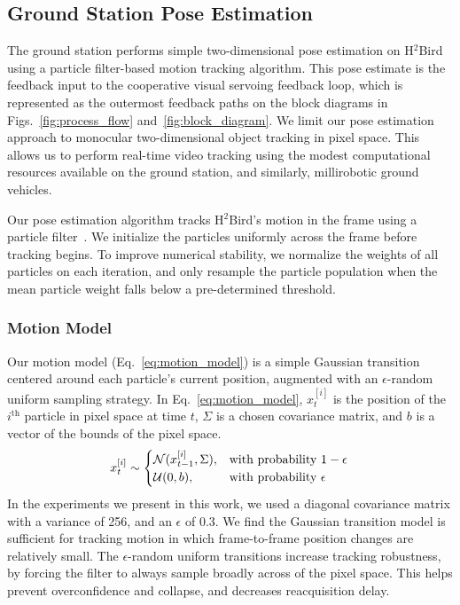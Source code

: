 \documentclass{aamas2013}
\begin{document}
\subsection{Ground Station Pose Estimation}
The ground station performs simple two-dimensional pose estimation on 
H$^2$Bird using a particle filter-based motion tracking algorithm. This pose 
estimate is the feedback input to the cooperative visual servoing feedback 
loop, which is represented as the outermost feedback paths on the block 
diagrams in Figs.~\ref{fig:process_flow} and~\ref{fig:block_diagram}. We 
limit our pose estimation approach to monocular two-dimensional object 
tracking in pixel space. This allows us to perform real-time video tracking 
using the modest computational resources available on the ground station, 
and similarly, millirobotic ground vehicles.

Our pose estimation algorithm tracks H$^2$Bird's motion in the frame using a 
particle filter~\cite{thrun2005probabilistic}. We initialize the particles 
uniformly across the frame before tracking begins. To improve numerical 
stability, we normalize the weights of all particles on each iteration, and 
only resample the particle population when the mean particle weight falls 
below a pre-determined threshold. 
\subsubsection{Motion Model}
Our motion model (Eq.~\ref{eq:motion_model}) is a simple Gaussian transition 
centered around each particle's current position, augmented with an 
$\epsilon$-random uniform sampling strategy. In Eq.~\ref{eq:motion_model}, 
$x^{[i]}_t$ is the position of the $i^\text{th}$ particle in pixel space at 
time $t$, $\Sigma$ is a chosen covariance matrix, and $b$ is a vector of the 
bounds of the pixel space.
\begin{equation}
\label{eq:motion_model}
x^{[i]}_t \sim \begin{cases}
\mathcal{N}(x^{[i]}_{t-1}, \Sigma), &\text{with probability } 1-\epsilon \\
\mathcal{U}(0,b),& \text{with probability } \epsilon \\
\end{cases}\\
\end{equation}
In the experiments we present in this work, we used a diagonal covariance matrix 
with a variance of 256, and an $\epsilon$ of 0.3. We find the Gaussian 
transition model is sufficient for tracking motion in which frame-to-frame 
position changes are relatively small. The $\epsilon$-random uniform 
transitions increase tracking robustness, by forcing the filter to always 
sample broadly across of the pixel space. This helps prevent overconfidence 
and collapse, and decreases reacquisition delay. 
\end{document}
